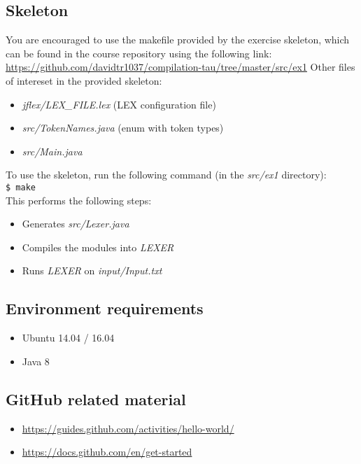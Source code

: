 \documentclass{article}
\begin{document}
\subsection{Skeleton}
You are encouraged to use the makefile provided by the exercise skeleton,
which can be found in the course repository using the following link: \\
\url{https://github.com/davidtr1037/compilation-tau/tree/master/src/ex1}
Other files of intereset in the provided skeleton:
\begin{itemize}
    \item \textit{jflex/LEX\_FILE.lex} (LEX configuration file)
    \item \textit{src/TokenNames.java} (enum with token types)
    \item \textit{src/Main.java}
\end{itemize}
To use the skeleton, run the following command (in the \textit{src/ex1} directory): \\
\texttt{\$ make} \\
This performs the following steps:
\begin{itemize}
    \item Generates \textit{src/Lexer.java}
    \item Compiles the modules into \textit{LEXER}
    \item Runs \textit{LEXER} on \textit{input/Input.txt}
\end{itemize}

\subsection{Environment requirements}
\begin{itemize}
\item Ubuntu 14.04 / 16.04
\item Java 8
\end{itemize}

\subsection{GitHub related material}
\begin{itemize}
    \item \url{https://guides.github.com/activities/hello-world/}
    \item \url{https://docs.github.com/en/get-started}
\end{itemize}
\end{document}
